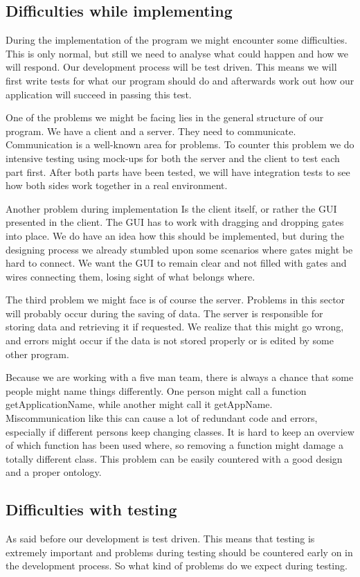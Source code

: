 \documentclass[a4paper]{article}
\begin{document}
\subsection{Difficulties while implementing}
During the implementation of the program we might encounter some difficulties. This is only normal, but still we need to analyse what could happen and how we will respond. Our development process will be test driven. This means we will first write tests for what our program should do and afterwards work out how our application will succeed in passing this test.
 
One of the problems we might be facing lies in the general structure of our program. We have a client and a server. They need to communicate. Communication is a well-known area for problems. To counter this problem we do intensive testing using mock-ups for both the server and the client to test each part first. After both parts have been tested, we will have integration tests to see how both sides work together in a real environment. 

Another problem during implementation Is the client itself, or rather the GUI presented in the client. The GUI has to work with dragging and dropping gates into place. We do have an idea how this should be implemented, but during the designing process we already stumbled upon some scenarios where gates might be hard to connect. We want the GUI to remain clear and not filled with gates and wires connecting them, losing sight of what belongs where.

The third problem we might face is of course the server. Problems in this sector will probably occur during the saving of data. The server is responsible for storing data and retrieving it if requested. We realize that this might go wrong, and errors might occur if the data is not stored properly or is edited by some other program. 

Because we are working with a five man team, there is always a chance that some people might name things differently. One person might call a function getApplicationName, while another might call it getAppName. Miscommunication like this can cause a lot of redundant code and errors, especially if different persons keep changing classes. It is hard to keep an overview of which function has been used where, so removing a function might damage a totally different class. This problem can be easily countered with a good design and a proper ontology.

\subsection{Difficulties with testing}
As said before our development is test driven. This means that testing is extremely important and problems during testing should be countered early on in the development process. So what kind of problems do we expect during testing. 
\end{document}

